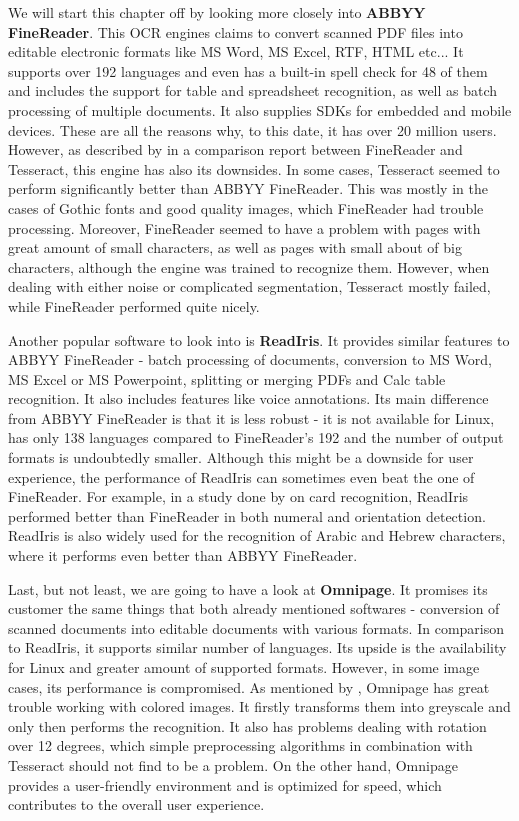 We will start this chapter off by looking more closely into \textbf{ABBYY FineReader}. This OCR engines claims to convert scanned PDF files into editable electronic formats like MS Word, MS Excel, RTF, HTML etc... It supports over 192 languages and even has a built-in spell check for 48 of them and includes the support for table and spreadsheet recognition, as well as batch processing of multiple documents. It also supplies SDKs for embedded and mobile devices. These are all the reasons why, to this date, it has over 20 million users. However, as described by \citet{comparisonTessABBYY} in a comparison report between FineReader and Tesseract, this engine has also its downsides. In some cases, Tesseract seemed to perform significantly better than ABBYY FineReader. This was mostly in the cases of Gothic fonts and good quality images, which FineReader had trouble processing. Moreover, FineReader seemed to have a problem with pages with great amount of small characters, as well as pages with small about of big characters, although the engine was trained to recognize them. However, when dealing with either noise or complicated segmentation, Tesseract mostly failed, while FineReader performed quite nicely.

Another popular software to look into is \textbf{ReadIris}. It provides similar features to ABBYY FineReader - batch processing of documents, conversion to MS Word, MS Excel or MS Powerpoint, splitting or merging PDFs and Calc table recognition. It also includes features like voice annotations. Its main difference from ABBYY FineReader is that it is less robust - it is not available for Linux, has only 138 languages compared to FineReader's 192 and the number of output formats is undoubtedly smaller. Although this might be a downside for user experience, the performance of ReadIris can sometimes even beat the one of FineReader. For example, in a study done by \citet{compABBYYIris} on card recognition, ReadIris performed better than FineReader in both numeral and orientation detection. ReadIris is also widely used for the recognition of Arabic and Hebrew characters, where it performs even better than ABBYY FineReader.

Last, but not least, we are going to have a look at \textbf{Omnipage}. It promises its customer the same things that both already mentioned softwares - conversion of scanned documents into editable documents with various formats. In comparison to ReadIris, it supports similar number of languages. Its upside is the availability for Linux and greater amount of supported formats. However, in some image cases, its performance is compromised. As mentioned by \citet{omnipageTest}, Omnipage has great trouble working with colored images. It firstly transforms them into greyscale and only then performs the recognition. It also has problems dealing with rotation over 12 degrees, which simple preprocessing algorithms in combination with Tesseract should not find to be a problem. On the other hand, Omnipage provides a user-friendly environment and is optimized for speed, which contributes to the overall user experience.

